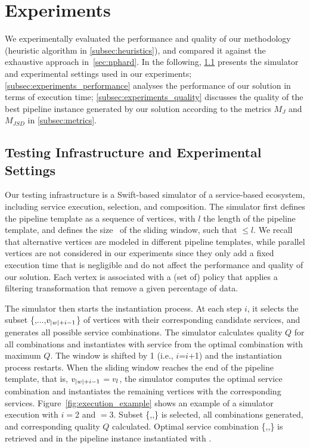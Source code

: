 \section{Experiments}\label{sec:experiment}
We experimentally evaluated the performance and quality of our methodology (heuristic algorithm in \cref{subsec:heuristics}), and compared it against the exhaustive approach in~\cref{sec:nphard}. In the following,
\cref{subsec:experiments_infrastructure} presents the simulator and experimental settings used in our experiments;
\cref{subsec:experiments_performance} analyses the performance of our solution in terms of execution time; \cref{subsec:experiments_quality} discusses the quality of the best pipeline instance generated by our solution according to the metrics $M_J$ and $M_{JSD}$ in \cref{subsec:metrics}.

\subsection{Testing Infrastructure and Experimental Settings}\label{subsec:experiments_infrastructure}
Our testing infrastructure is a Swift-based simulator of a service-based ecosystem, including service execution, selection, and composition.
The simulator first defines the pipeline template as a sequence of vertices, with $l$ the length of the pipeline template, and defines the size \windowsize\ of the sliding window, such that \windowsize$\leq$$l$.
We recall that alternative vertices are modeled in different pipeline templates, while parallel vertices are not considered in our experiments since they only add a fixed execution time that is negligible and do not affect the performance and quality of our solution.
Each vertex is associated with a (set of) policy that applies a filtering transformation that remove a given percentage of data.

The simulator then starts the instantiation process.
At each step $i$, it selects the subset \{,$\ldots$,$v_{|w|+i-1}$\} of vertices with their corresponding candidate services, and generates all possible service combinations.
The simulator calculates quality $Q$ for all combinations and instantiates  with service  from the optimal combination with maximum $Q$.
The window is shifted by 1 (i.e., $i$=$i$+1) and the instantiation process restarts.
When the sliding window reaches the end of the pipeline template, that is, $v_{|w|+i-1}$$=$$v_{l}$, the simulator computes the optimal service combination and instantiates the remaining vertices with the corresponding services.
Figure~\ref{fig:execution_example} shows an example of a simulator execution with $i$$=$2 and \windowsize$=$3. Subset \{,,\} is selected, all combinations generated, and corresponding quality $Q$ calculated.
Optimal service combination \{,,\} is retrieved and  in the pipeline instance instantiated with .

